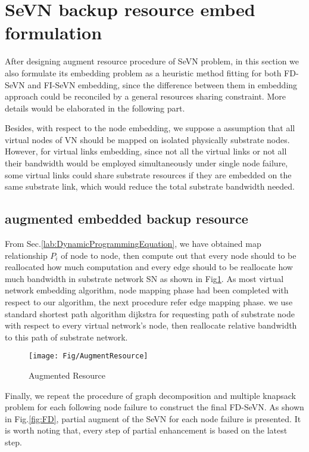 \section{SeVN backup resource embed formulation}
After designing augment resource procedure of SeVN problem, in this section we also formulate its embedding problem as a heuristic method fitting for both FD-SeVN and FI-SeVN embedding, since the difference between them in embedding approach could be reconciled by a general resources sharing constraint. More details would be elaborated in the following part.

Besides, with respect to the node embedding, we suppose a assumption that all virtual nodes of VN should be mapped on isolated physically substrate nodes. However, for virtual links embedding, since not all the virtual links or not all their bandwidth would be employed simultaneously under single node failure, some virtual links could share substrate resources if they are embedded on the same substrate link, which would reduce the total substrate bandwidth needed.


\subsection{augmented embedded backup resource}
From Sec.\ref{lab:DynamicProgrammingEquation}, we have obtained map relationship $P_i$ of node to node, then compute out that every node should to be reallocated how much computation and every edge should to be reallocate how much bandwidth in substrate network SN as shown in Fig\ref{fig:AugmentResource}. As most virtual network embedding algorithm, node mapping phase had been completed with respect to our algorithm, the next procedure refer edge mapping phase. we use standard shortest path algorithm dijkstra for requesting path of substrate node with respect to every virtual network's node, then reallocate relative bandwidth to this path of substrate network.

\begin{figure}
  \centering
  \texttt{[image: Fig/AugmentResource]}\\
  \caption{Augmented Resource}\label{fig:AugmentResource}
\end{figure}



Finally, we repeat the procedure of graph decomposition and multiple knapsack problem for each following node failure to construct the final FD-SeVN. As shown in Fig.\ref{fig:FD}, partial augment of the SeVN for each node failure is presented. It is
worth noting that, every step of partial enhancement is based on the latest step.


